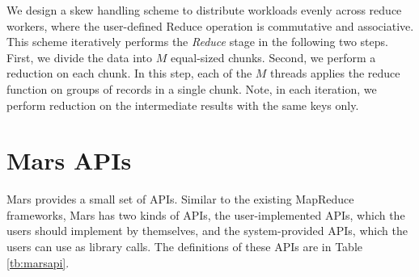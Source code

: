 We design a skew handling scheme to distribute workloads evenly across reduce workers, where the user-defined Reduce operation is commutative and associative.
This scheme iteratively performs the {\em Reduce} stage in the following two steps.  First, we divide the data into $M$ equal-sized chunks.  Second, we perform a reduction on each chunk. In this step, each of the $M$ threads applies the reduce function on groups of records in a single chunk.  Note, in each iteration, we perform reduction on the intermediate results with the same keys only.


\section{Mars APIs}
Mars provides a small set of APIs. Similar to the existing MapReduce
frameworks, Mars has two kinds of APIs, the user-implemented APIs,
which the users should implement by themselves, and the
system-provided APIs, which the users can use as library calls.
The definitions of these APIs are in Table \ref{tb:marsapi}.

